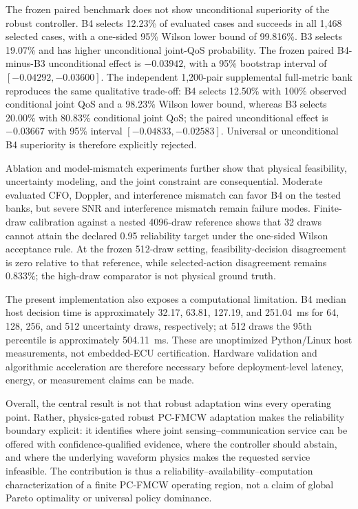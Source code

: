 The frozen paired benchmark does not show unconditional superiority of the robust controller. B4 selects 12.23\% of evaluated cases and succeeds in all 1,468 selected cases, with a one-sided 95\% Wilson lower bound of 99.816\%. B3 selects 19.07\% and has higher unconditional joint-QoS probability. The frozen paired B4-minus-B3 unconditional effect is $-0.03942$, with a 95\% bootstrap interval of $[-0.04292,-0.03600]$. The independent 1,200-pair supplemental full-metric bank reproduces the same qualitative trade-off: B4 selects 12.50\% with 100\% observed conditional joint QoS and a 98.23\% Wilson lower bound, whereas B3 selects 20.00\% with 80.83\% conditional joint QoS; the paired unconditional effect is $-0.03667$ with 95\% interval $[-0.04833,-0.02583]$. Universal or unconditional B4 superiority is therefore explicitly rejected.

Ablation and model-mismatch experiments further show that physical feasibility, uncertainty modeling, and the joint constraint are consequential. Moderate evaluated CFO, Doppler, and interference mismatch can favor B4 on the tested banks, but severe SNR and interference mismatch remain failure modes. Finite-draw calibration against a nested 4096-draw reference shows that 32 draws cannot attain the declared 0.95 reliability target under the one-sided Wilson acceptance rule. At the frozen 512-draw setting, feasibility-decision disagreement is zero relative to that reference, while selected-action disagreement remains 0.833\%; the high-draw comparator is not physical ground truth.

The present implementation also exposes a computational limitation. B4 median host decision time is approximately 32.17, 63.81, 127.19, and 251.04~ms for 64, 128, 256, and 512 uncertainty draws, respectively; at 512 draws the 95th percentile is approximately 504.11~ms. These are unoptimized Python/Linux host measurements, not embedded-ECU certification. Hardware validation and algorithmic acceleration are therefore necessary before deployment-level latency, energy, or measurement claims can be made.

Overall, the central result is not that robust adaptation wins every operating point. Rather, physics-gated robust PC-FMCW adaptation makes the reliability boundary explicit: it identifies where joint sensing--communication service can be offered with confidence-qualified evidence, where the controller should abstain, and where the underlying waveform physics makes the requested service infeasible. The contribution is thus a reliability--availability--computation characterization of a finite PC-FMCW operating region, not a claim of global Pareto optimality or universal policy dominance.
